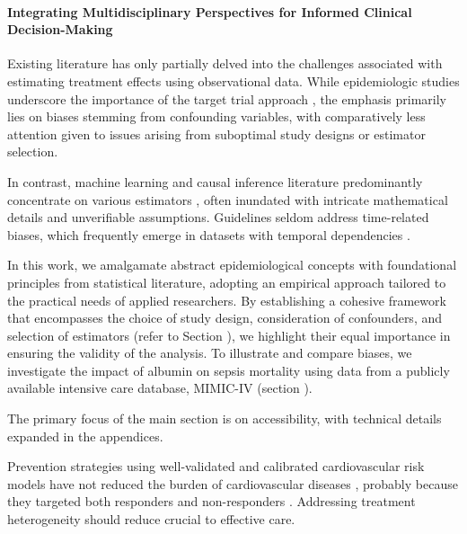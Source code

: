 \documentclass[10pt,letterpaper]{article}
\begin{document}
  \paragraph{Integrating Multidisciplinary Perspectives for Informed Clinical Decision-Making}
 Existing literature has only partially delved into the challenges associated with estimating treatment effects using observational data. While epidemiologic studies underscore the importance of the target trial approach \cite{von2007strengthening,benchimol2015reporting,hernan2020causal,schneeweiss2021conducting,zeng2022uncovering}, the emphasis primarily lies on biases stemming from confounding variables, with comparatively less attention given to issues arising from suboptimal study designs or estimator selection.

 In contrast, machine learning and causal inference literature predominantly concentrate on various estimators \cite{belloni2014high,chernozhukov2018double,shalit2016tutorial,sharma2018tutorial,moraffah2021causal}, often inundated with intricate mathematical details and unverifiable assumptions. Guidelines seldom address time-related biases, which frequently emerge in datasets with temporal dependencies \cite{suissa2008immortal,fu2021timing}.

 In this work, we amalgamate abstract epidemiological concepts with foundational principles from statistical literature, adopting an empirical approach tailored to the practical needs of applied researchers. By establishing a cohesive framework that encompasses the choice of study design, consideration of confounders, and selection of estimators (refer to Section ), we highlight their equal importance in ensuring the validity of the analysis. To illustrate and compare biases, we investigate the impact of albumin on sepsis mortality using data from a publicly available intensive care database, MIMIC-IV \cite{johnson2020mimic} (section ).

 The primary focus of the main section is on accessibility, with technical details expanded in the appendices.


Prevention strategies using
well-validated and calibrated cardiovascular risk models have not reduced the
burden of cardiovascular diseases \cite{eriksen2021effectiveness}, probably because they targeted both
responders and non-responders  \cite{krska2016implementation}. Addressing treatment heterogeneity should reduce  crucial to
effective care.
\end{document}
